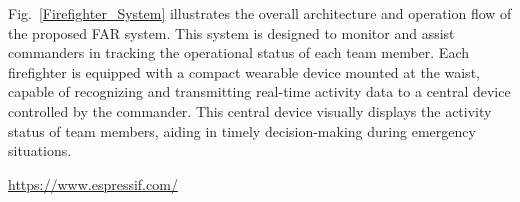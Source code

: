 \documentclass[journal,twoside,web]{ieeecolor}
\begin{document}
Fig.~\ref{Firefighter_System} illustrates the overall architecture and operation flow of the proposed FAR system. This system is designed to monitor and assist commanders in tracking the operational status of each team member. Each firefighter is equipped with a compact wearable device mounted at the waist, capable of recognizing and transmitting real-time activity data to a central device controlled by the commander. This central device visually displays the activity status of team members, aiding in timely decision-making during emergency situations.

\begin{table}[h]
\caption{Hardware configuration and experimental platform.}
\label{table_hardware}
\begin{threeparttable}
\renewcommand{\arraystretch}{1.2} %
\begin{tablenotes}
\footnotesize
\item[1] \url{https://www.espressif.com/}
\end{tablenotes}
\end{threeparttable}
\end{table}
\end{document}
